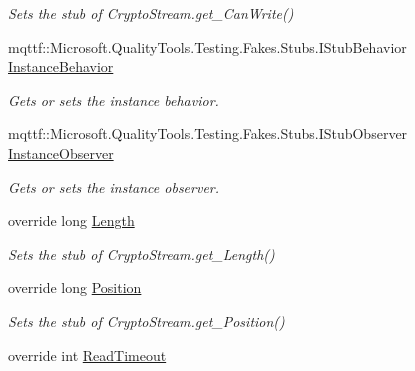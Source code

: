 \begin{DoxyCompactItemize}
\begin{DoxyCompactList}\small\item\em Sets the stub of Crypto\-Stream.\-get\-\_\-\-Can\-Write()\end{DoxyCompactList}\item 
mqttf\-::\-Microsoft.\-Quality\-Tools.\-Testing.\-Fakes.\-Stubs.\-I\-Stub\-Behavior \hyperlink{class_system_1_1_security_1_1_cryptography_1_1_fakes_1_1_stub_crypto_stream_ab7cafc18bd96965829a94de5e8ae3058}{Instance\-Behavior}
\begin{DoxyCompactList}\small\item\em Gets or sets the instance behavior.\end{DoxyCompactList}\item 
mqttf\-::\-Microsoft.\-Quality\-Tools.\-Testing.\-Fakes.\-Stubs.\-I\-Stub\-Observer \hyperlink{class_system_1_1_security_1_1_cryptography_1_1_fakes_1_1_stub_crypto_stream_ad9276161def4402f8f5468574d818b51}{Instance\-Observer}
\begin{DoxyCompactList}\small\item\em Gets or sets the instance observer.\end{DoxyCompactList}\item 
override long \hyperlink{class_system_1_1_security_1_1_cryptography_1_1_fakes_1_1_stub_crypto_stream_a986283e1d9598d2db9d3d5666ae49a78}{Length}
\begin{DoxyCompactList}\small\item\em Sets the stub of Crypto\-Stream.\-get\-\_\-\-Length()\end{DoxyCompactList}\item 
override long \hyperlink{class_system_1_1_security_1_1_cryptography_1_1_fakes_1_1_stub_crypto_stream_aa00c3a516f311a869c5293478fb4a4f1}{Position}
\begin{DoxyCompactList}\small\item\em Sets the stub of Crypto\-Stream.\-get\-\_\-\-Position()\end{DoxyCompactList}\item 
override int \hyperlink{class_system_1_1_security_1_1_cryptography_1_1_fakes_1_1_stub_crypto_stream_a3e8e3c1220de4b8eb0174943a0fa3dc6}{Read\-Timeout}

\end{DoxyCompactItemize}
